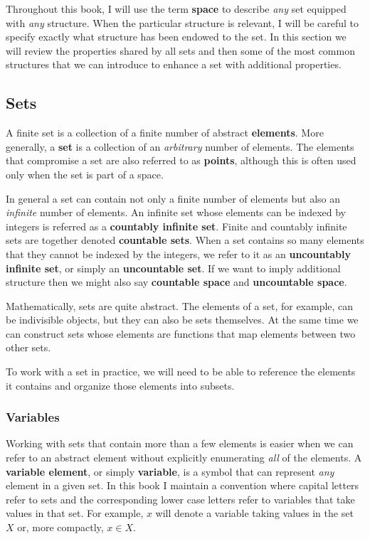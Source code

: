 \documentclass[
  letterpaper,
  DIV=11,
  numbers=noendperiod]{scrartcl}
\begin{document}
Throughout this book, I will use the term \textbf{space} to describe
\emph{any} set equipped with \emph{any} structure. When the particular
structure is relevant, I will be careful to specify exactly what
structure has been endowed to the set. In this section we will review
the properties shared by all sets and then some of the most common
structures that we can introduce to enhance a set with additional
properties.

\subsection{Sets}\label{sets}

A finite set is a collection of a finite number of abstract
\textbf{elements}. More generally, a \textbf{set} is a collection of an
\emph{arbitrary} number of elements. The elements that compromise a set
are also referred to as \textbf{points}, although this is often used
only when the set is part of a space.

In general a set can contain not only a finite number of elements but
also an \emph{infinite} number of elements. An infinite set whose
elements can be indexed by integers is referred as a \textbf{countably
infinite set}. Finite and countably infinite sets are together denoted
\textbf{countable sets}. When a set contains so many elements that they
cannot be indexed by the integers, we refer to it as an
\textbf{uncountably infinite set}, or simply an \textbf{uncountable
set}. If we want to imply additional structure then we might also say
\textbf{countable space} and \textbf{uncountable space}.

Mathematically, sets are quite abstract. The elements of a set, for
example, can be indivisible objects, but they can also be sets
themselves. At the same time we can construct sets whose elements are
functions that map elements between two other sets.

To work with a set in practice, we will need to be able to reference the
elements it contains and organize those elements into subsets.

\subsubsection{Variables}\label{variables}

Working with sets that contain more than a few elements is easier when
we can refer to an abstract element without explicitly enumerating
\emph{all} of the elements. A \textbf{variable element}, or simply
\textbf{variable}, is a symbol that can represent \emph{any} element in
a given set. In this book I maintain a convention where capital letters
refer to sets and the corresponding lower case letters refer to
variables that take values in that set. For example, \(x\) will denote a
variable taking values in the set \(X\) or, more compactly, \(x \in X\).
\end{document}
